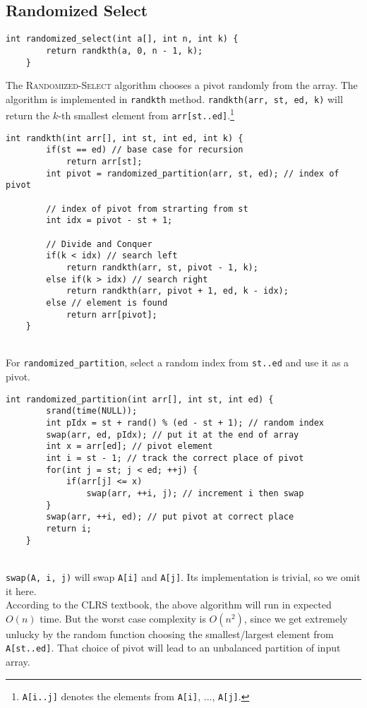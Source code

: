 \documentclass[12pt]{article}
\begin{document}
\subsection{Randomized Select}
\begin{lstlisting}[style=Cstyle]
	int randomized_select(int a[], int n, int k) {
		return randkth(a, 0, n - 1, k);
	}
\end{lstlisting}
The \textsc{Randomized-Select} algorithm chooses a pivot randomly from the array. The algorithm is implemented in \texttt{randkth} method. \texttt{randkth(arr, st, ed, k)} will return the $k$-th smallest element from \texttt{arr[st..ed]}.\footnote{\texttt{A[i..j]} denotes the elements from \texttt{A[i]}, ..., \texttt{A[j]}.}
\begin{lstlisting}[style=Cstyle]
	int randkth(int arr[], int st, int ed, int k) {
		if(st == ed) // base case for recursion
			return arr[st];
		int pivot = randomized_partition(arr, st, ed); // index of pivot
		
		// index of pivot from strarting from st
		int idx = pivot - st + 1; 
		
		// Divide and Conquer
		if(k < idx) // search left
			return randkth(arr, st, pivot - 1, k);
		else if(k > idx) // search right
			return randkth(arr, pivot + 1, ed, k - idx);
		else // element is found
			return arr[pivot];
	}
\end{lstlisting}~\\
For \texttt{randomized\_partition}, select a random index from \texttt{st..ed} and use it as a pivot.
\begin{lstlisting}[style=Cstyle]
	int randomized_partition(int arr[], int st, int ed) {
		srand(time(NULL));
		int pIdx = st + rand() % (ed - st + 1); // random index
		swap(arr, ed, pIdx); // put it at the end of array
		int x = arr[ed]; // pivot element
		int i = st - 1; // track the correct place of pivot
		for(int j = st; j < ed; ++j) {
			if(arr[j] <= x)
				swap(arr, ++i, j); // increment i then swap
		}
		swap(arr, ++i, ed); // put pivot at correct place
		return i;
	}
\end{lstlisting}~\\
\texttt{swap(A, i, j)} will swap \texttt{A[i]} and \texttt{A[j]}. Its implementation is trivial, so we omit it here.\\
According to the CLRS textbook, the above algorithm will run in expected $O(n)$ time. But the worst case complexity is $O(n^2)$, since we get extremely unlucky by the random function choosing the smallest/largest element from \texttt{A[st..ed]}. That choice of pivot will lead to an unbalanced partition of input array.\\
\end{document}
